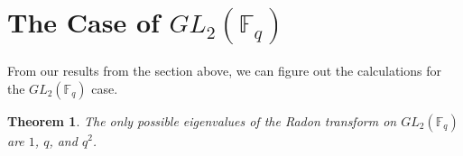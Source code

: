 \documentclass[12pt,reqno]{amsart}
\newtheorem{thm}{Theorem}[section]
\theoremstyle{definition}
\theoremstyle{remark}
\newtheorem{rem}[thm]{Remark}
\numberwithin{equation}{section}
\newcommand{\GL}[1]{GL_{#1}(\mathbb{F}_q)}
\begin{document}



\section{The Case of $\GL{2}$}


From our results from the section above, we can figure out the calculations for the $\GL{2}$ case.

\begin{thm}\label{eigenvalues_gl2}
    The only possible eigenvalues of the Radon transform on $\GL{2}$ are $1$, $q$, and $q^2$.
\end{thm}
\end{document}
